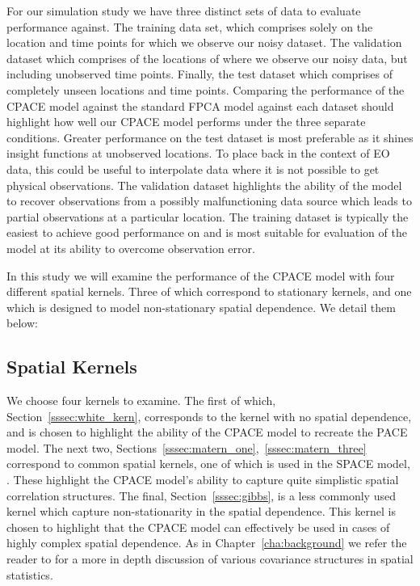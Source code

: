 For our simulation study we have three distinct sets of data to evaluate performance against.
The training data set, which comprises solely on the location and time points for which we observe our noisy dataset.
The validation dataset which comprises of the locations of where we observe our noisy data, but including unobserved time points. 
Finally, the test dataset which comprises of completely unseen locations and time points.
Comparing the performance of the CPACE model against the standard FPCA model against each dataset should highlight how well our CPACE model performs under the three separate conditions.
Greater performance on the test dataset is most preferable as it shines insight functions at unobserved locations.
To place back in the context of EO data, this could be useful to interpolate data where it is not possible to get physical observations.
The validation dataset highlights the ability of the model to recover observations from a possibly malfunctioning data source which leads to partial observations at a particular location.
The training dataset is typically the easiest to achieve good performance on and is most suitable for evaluation of the model at its ability to overcome observation error.

In this study we will examine the performance of the CPACE model with four different spatial kernels. Three of which correspond to stationary kernels, and one which is designed to model non-stationary spatial dependence. We detail them below: 

\subsection{Spatial Kernels  \label{ssec:spatial_kern}}
We choose four kernels to examine. The first of which, Section~\ref{sssec:white_kern}, corresponds to the kernel with no spatial dependence, and is chosen to highlight the ability of the CPACE model to recreate the PACE model. The next two, Sections~\ref{sssec:matern_one},~\ref{sssec:matern_three} correspond to common spatial kernels, one of which is used in the SPACE model, \citep{liu_functional_2017}. These highlight the CPACE model's ability to capture quite simplistic spatial correlation structures. The final, Section~\ref{sssec:gibbs}, is a less commonly used kernel which capture non-stationarity in the spatial dependence. This kernel is chosen to highlight that the CPACE model can effectively be used in cases of highly complex spatial dependence. As in Chapter~\ref{cha:background} we refer the reader to \cite{cressie_statistics_2011} for a more in depth discussion of various covariance structures in spatial statistics.

